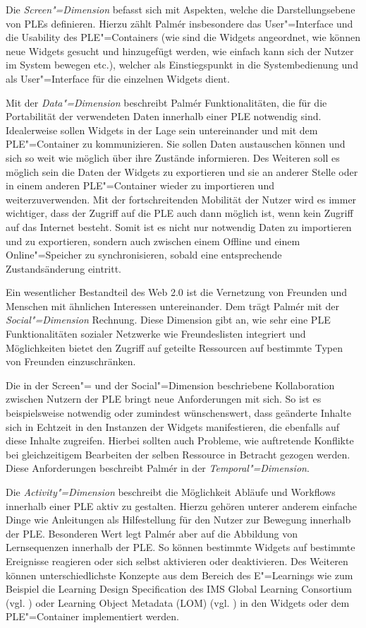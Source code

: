 Die \emph{Screen"=Dimension} befasst sich mit Aspekten, welche die Darstellungsebene von \acp{PLE} definieren. Hierzu zählt Palmér insbesondere das User"=Interface und die Usability des \ac{PLE}"=Containers (wie sind die Widgets angeordnet, wie können neue Widgets gesucht und hinzugefügt werden, wie einfach kann sich der Nutzer im System bewegen etc.), welcher als Einstiegspunkt in die Systembedienung und als User"=Interface für die einzelnen Widgets dient.

Mit der \emph{Data"=Dimension} beschreibt Palmér Funktionalitäten, die für die Portabilität der verwendeten Daten innerhalb einer \ac{PLE} notwendig sind. Idealerweise sollen Widgets in der Lage sein untereinander und mit dem \ac{PLE}"=Container zu kommunizieren. Sie sollen Daten austauschen können und sich so weit wie möglich über ihre Zustände informieren. Des Weiteren soll es möglich sein die Daten der Widgets zu exportieren und sie an anderer Stelle oder in einem anderen \ac{PLE}"=Container wieder zu importieren und weiterzuverwenden. Mit der fortschreitenden Mobilität der Nutzer wird es immer wichtiger, dass der Zugriff auf die \ac{PLE} auch dann möglich ist, wenn kein Zugriff auf das Internet besteht. Somit ist es nicht nur notwendig Daten zu importieren und zu exportieren, sondern auch zwischen einem Offline und einem Online"=Speicher zu synchronisieren, sobald eine entsprechende Zustandsänderung eintritt.

Ein wesentlicher Bestandteil des Web 2.0 ist die Vernetzung von Freunden und Menschen mit ähnlichen Interessen untereinander. Dem trägt Palmér mit der \emph{Social"=Dimension} Rechnung. Diese Dimension gibt an, wie sehr eine \ac{PLE} Funktionalitäten sozialer Netzwerke wie Freundeslisten integriert und Möglichkeiten bietet den Zugriff auf geteilte Ressourcen auf bestimmte Typen von Freunden einzuschränken.

Die in der Screen"= und der Social"=Dimension beschriebene Kollaboration zwischen Nutzern der \ac{PLE} bringt neue Anforderungen mit sich. So ist es beispielsweise notwendig oder zumindest wünschenswert, dass geänderte Inhalte sich in Echtzeit in den Instanzen der Widgets manifestieren, die ebenfalls auf diese Inhalte zugreifen. Hierbei sollten auch Probleme, wie auftretende Konflikte bei gleichzeitigem Bearbeiten der selben Ressource in Betracht gezogen werden. Diese Anforderungen beschreibt Palmér in der \emph{Temporal"=Dimension}.

Die \emph{Activity"=Dimension} beschreibt die Möglichkeit Abläufe und Workflows innerhalb einer \ac{PLE} aktiv zu gestalten. Hierzu gehören unterer anderem einfache Dinge wie Anleitungen als Hilfestellung für den Nutzer zur Bewegung innerhalb der \ac{PLE}. Besonderen Wert legt Palmér aber auf die Abbildung von Lernsequenzen innerhalb der \ac{PLE}. So können bestimmte Widgets auf bestimmte Ereignisse reagieren oder sich selbst aktivieren oder deaktivieren. Des Weiteren können unterschiedlichste Konzepte aus dem Bereich des E"=Learnings wie zum Beispiel die Learning Design Specification des IMS Global Learning Consortium (vgl. \cite{IMS2012}) oder Learning Object Metadata (LOM) (vgl. \cite{LOM2002}) in den Widgets oder dem \ac{PLE}"=Container implementiert werden.

